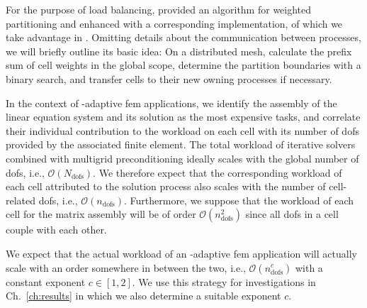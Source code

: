
For the purpose of load balancing, \textcite[Sec.~3.3]{burstedde2011} provided an algorithm for weighted partitioning and enhanced \pforest{} \textcite{p4est22} with a corresponding implementation, of which we take advantage in \dealii{}. Omitting details about the communication between processes, we will briefly outline its basic idea: On a distributed mesh, calculate the prefix sum of cell weights in the global scope, determine the partition boundaries with a binary search, and transfer cells to their new owning processes if necessary.




In the context of \hp-adaptive \gls{fem} applications, we identify the assembly of the linear equation system and its solution as the most expensive tasks, and correlate their individual contribution to the workload on each cell with its number of \glspl{dof} provided by the associated finite element.
The total workload of iterative solvers combined with multigrid preconditioning ideally scales with the global number of \glspl{dof}, i.e., $\mathcal{O}\left(N_\text{dofs}\right)$. We therefore expect that the corresponding workload of each cell attributed to the solution process also scales with the number of cell-related \glspl{dof}, i.e., $\mathcal{O}\left(n_\text{dofs}\right)$. Furthermore, we suppose that the workload of each cell for the matrix assembly will be of order $\mathcal{O}\left(n_\text{dofs}^2\right)$ since all \glspl{dof} in a cell couple with each other.

We expect that the actual workload of an \hp-adaptive \gls{fem} application will actually scale with an order somewhere in between the two, i.e., $\mathcal{O}\left(n_\text{dofs}^c\right)$ with a constant exponent $c \in [1,2]$. We use this strategy for investigations in Ch.~\ref{ch:results} in which we also determine a suitable exponent $c$.

